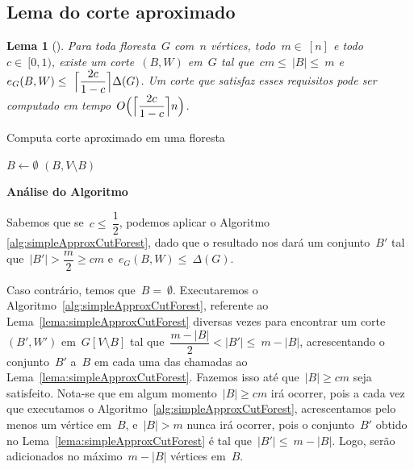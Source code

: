 \documentclass[a4paper,12pt]{article}
\DeclarePairedDelimiter\ceil{\lceil}{\rceil}
\newtheorem{lem}{Lema}
\begin{document}
\subsection{Lema do corte aproximado}

\begin{lem}[{\cite[Lemma 3]{Schmidt15}}]
\label{lema:approxCutForest}
	Para toda floresta~$G$ com~$n$ vértices, todo~$m \in~[n]$
	e todo~$c \in~[0,1)$,
	existe um corte~$(B,W)$ em~$G$ tal 
	que~$cm \le~|B| \le~m$ 
	e~$e_G(B,W) \le~\ceil[\Big]{ \dfrac{2c}{1-c}} \Delta(G)$.
	Um corte que satisfaz esses requisitos pode ser computado em
	tempo~$O\Big(\ceil[\Big]{ \dfrac{2c}{1-c}} n\Big)$.
\end{lem}

\medskip
\medskip

\begin{algorithm}[H]
\label{alg:approxCutForest}

	\caption{Computa corte aproximado em uma floresta}
	{
		$B \gets \emptyset$\;
	}
	\Return $(B,V\setminus B)$

\end{algorithm}	

\bigskip
\bigskip
\bigskip

\textbf{Análise do Algoritmo}

	Sabemos que se~$c \le~\dfrac{1}{2}$, podemos aplicar o Algoritmo 
	\ref{alg:simpleApproxCutForest}, 
	dado que o resultado nos dará um conjunto~$B'$ tal 
	que~$|B'|>\dfrac{m}{2}\ge cm$ e~$e_G(B,W)\le~\Delta(G)$.

	Caso contrário, temos que~$B =~\emptyset$.
	Executaremos o 
	Algoritmo~\ref{alg:simpleApproxCutForest}, referente ao 
	Lema~\ref{lema:simpleApproxCutForest}
	diversas vezes para 
	encontrar 
	um corte~$(B',W')$ em~$G[V\setminus B]$ tal 
	que~$\dfrac{m-|B|}{2}<|B'|\le~m-|B|$,
	acrescentando o conjunto~$B'$ a~$B$ em cada uma das chamadas ao 
	Lema~\ref{lema:simpleApproxCutForest}.
	Fazemos isso até que~$|B|\ge cm$ seja satisfeito.
	Nota-se que em algum momento~$|B|\ge cm$ irá ocorrer, pois a cada vez
	que executamos o 
	Algoritmo~\ref{alg:simpleApproxCutForest}, 
	acrescentamos pelo menos um vértice em~$B$,
	e~$|B|>m$ nunca irá ocorrer, pois o conjunto~$B'$ obtido no 
	Lema~\ref{lema:simpleApproxCutForest} é
	tal que~$|B'|\le~m-|B|$. Logo, serão adicionados no 
	máximo~$m-|B|$ vértices em~$B$.
\end{document}
